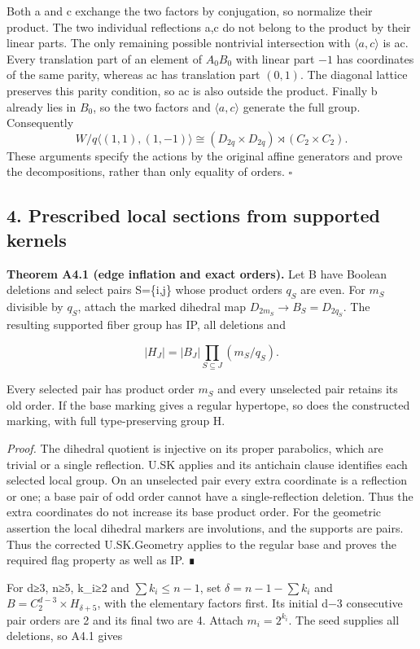 \documentclass[
  11pt,
  a4paper,
]{article}
\begin{document}
Both a and c exchange the two factors by conjugation, so normalize their
product. The two individual reflections a,c do not belong to the product
by their linear parts. The only remaining possible nontrivial
intersection with \(\langle a,c\rangle\) is ac. Every translation part
of an element of \(A_0B_0\) with linear part \(-1\) has coordinates of
the same parity, whereas ac has translation part \((0,1)\). The diagonal
lattice preserves this parity condition, so ac is also outside the
product. Finally b already lies in \(B_0\), so the two factors and
\(\langle a,c\rangle\) generate the full group. Consequently \[
 W/q\langle(1,1),(1,-1)\rangle
 \cong(D_{2q}\times D_{2q})\rtimes(C_2\times C_2).
 \tag{A-S7}
\] These arguments specify the actions by the original affine generators
and prove the decompositions, rather than only equality of orders.
\(\square\)

\subsection{4. Prescribed local sections from supported
kernels}\label{prescribed-local-sections-from-supported-kernels}

\textbf{Theorem A4.1 (edge inflation and exact orders).} Let B have
Boolean deletions and select pairs S=\{i,j\} whose product orders
\(q_S\) are even. For \(m_S\) divisible by \(q_S\), attach the marked
dihedral map \(D_{2m_S}\to B_S=D_{2q_S}\). The resulting supported fiber
group has IP, all deletions and

\[
 |H_J|=|B_J|\prod_{S\subseteq J}(m_S/q_S).
\]

Every selected pair has product order \(m_S\) and every unselected pair
retains its old order. If the base marking gives a regular hypertope, so
does the constructed marking, with full type-preserving group H.

\emph{Proof.} The dihedral quotient is injective on its proper
parabolics, which are trivial or a single reflection. U.SK applies and
its antichain clause identifies each selected local group. On an
unselected pair every extra coordinate is a reflection or one; a base
pair of odd order cannot have a single-reflection deletion. Thus the
extra coordinates do not increase its base product order. For the
geometric assertion the local dihedral markers are involutions, and the
supports are pairs. Thus the corrected U.SK.Geometry applies to the
regular base and proves the required flag property as well as IP. ∎

For d≥3, n≥5, k\_i≥2 and \(\sum k_i\le n-1\), set
\(\delta=n-1-\sum k_i\) and \(B=C_2^{d-3}\times H_{\delta+5}\), with the
elementary factors first. Its initial d−3 consecutive pair orders are 2
and its final two are 4. Attach \(m_i=2^{k_i}\). The seed supplies all
deletions, so A4.1 gives
\end{document}
